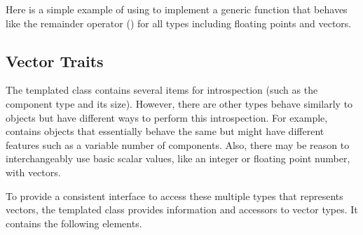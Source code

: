 Here is a simple example of using  to implement a generic
function that behaves like the remainder operator (\textcode{\%}) for all
types including floating points and vectors.





\subsection{Vector Traits}
\label{sec:VectorTraits}


The templated  class contains several items for introspection (such as the component type and its size).
However, there are other types behave similarly to  objects but have different ways to perform this introspection.
 For example, \VTKm contains \Veclike objects that essentially behave the same but might have different features such as a variable number of components.
Also, there may be reason to interchangeably use basic scalar values, like an integer or floating point number, with vectors.

To provide a consistent interface to access these multiple types that represents vectors, the  templated class provides information and accessors to vector types.
It contains the following elements.


